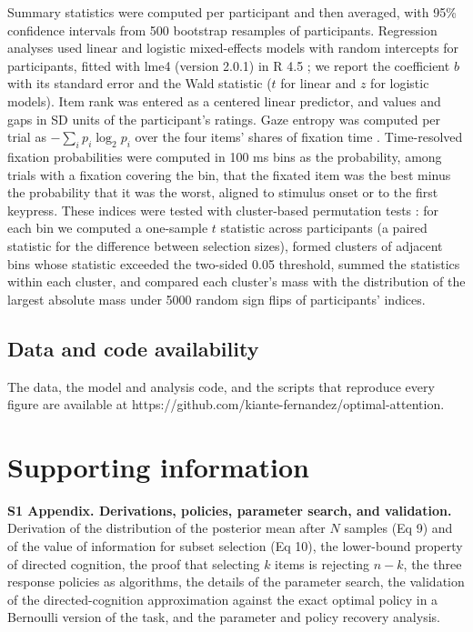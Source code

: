 \documentclass[10pt,letterpaper]{article}
\begin{document}
Summary statistics were computed per participant and then averaged, with
95\% confidence intervals from 500 bootstrap resamples of participants.
Regression analyses used linear and logistic mixed-effects models with
random intercepts for participants, fitted with lme4 (version 2.0.1)
\cite{bates2015} in R 4.5 \cite{rcoreteam2025}; we report the
coefficient \(b\) with its standard error and the Wald statistic (\(t\)
for linear and \(z\) for logistic models). Item rank was entered as a
centered linear predictor, and values and gaps in SD units of the
participant's ratings. Gaze entropy was computed per trial as
\(-\sum_i p_i \log_2 p_i\) over the four items' shares of fixation time
\cite{fromer2026}. Time-resolved fixation probabilities were computed in
100 ms bins as the probability, among trials with a fixation covering
the bin, that the fixated item was the best minus the probability that
it was the worst, aligned to stimulus onset or to the first keypress.
These indices were tested with cluster-based permutation tests
\cite{maris2007}: for each bin we computed a one-sample \(t\) statistic
across participants (a paired statistic for the difference between
selection sizes), formed clusters of adjacent bins whose statistic
exceeded the two-sided 0.05 threshold, summed the statistics within each
cluster, and compared each cluster's mass with the distribution of the
largest absolute mass under 5000 random sign flips of participants'
indices.

\subsection*{Data and code
availability}\label{data-and-code-availability}

The data, the model and analysis code, and the scripts that reproduce
every figure are available at
https://github.com/kiante-fernandez/optimal-attention.

\section*{Supporting information}\label{supporting-information}

\textbf{S1 Appendix. Derivations, policies, parameter search, and
validation.} Derivation of the distribution of the posterior mean after
\(N\) samples (Eq 9) and of the value of information for subset
selection (Eq 10), the lower-bound property of directed cognition, the
proof that selecting \(k\) items is rejecting \(n - k\), the three
response policies as algorithms, the details of the parameter search,
the validation of the directed-cognition approximation against the exact
optimal policy in a Bernoulli version of the task, and the parameter and
policy recovery analysis.

\nolinenumbers

\end{document}
